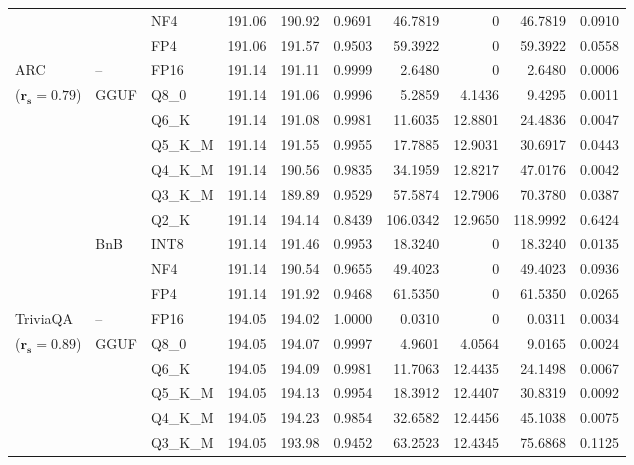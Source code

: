 \begin{longtable}{ll l rrrrrrr}
 &  & NF4 & 191.06 & 190.92 & 0.9691 & 46.7819 & \cellcolor{cyan!12} $0$ & 46.7819 & 0.0910 \\
 &  & FP4 & 191.06 & 191.57 & 0.9503 & 59.3922 & \cellcolor{cyan!12} $0$ & 59.3922 & 0.0558 \\
\midrule
ARC & -- & FP16 & 191.14 & 191.11 & 0.9999 & 2.6480 & \cellcolor{cyan!12} $0$ & 2.6480 & 0.0006 \\
{\small ($\mathbf{r_s{=}0.79}$)} & GGUF & Q8\_0 & 191.14 & 191.06 & 0.9996 & 5.2859 & 4.1436 & 9.4295 & 0.0011 \\
 &  & Q6\_K & 191.14 & 191.08 & 0.9981 & 11.6035 & 12.8801 & 24.4836 & 0.0047 \\
 &  & Q5\_K\_M & 191.14 & 191.55 & 0.9955 & 17.7885 & 12.9031 & 30.6917 & 0.0443 \\
 &  & Q4\_K\_M & 191.14 & 190.56 & 0.9835 & 34.1959 & 12.8217 & 47.0176 & 0.0042 \\
 &  & Q3\_K\_M & 191.14 & 189.89 & 0.9529 & 57.5874 & 12.7906 & 70.3780 & 0.0387 \\
 &  & Q2\_K & 191.14 & 194.14 & \cellcolor{red!18} 0.8439 & \cellcolor{red!18} 106.0342 & 12.9650 & \cellcolor{red!18} 118.9992 & \cellcolor{red!18} 0.6424 \\
 & BnB & INT8 & 191.14 & 191.46 & 0.9953 & 18.3240 & \cellcolor{cyan!12} $0$ & 18.3240 & 0.0135 \\
 &  & NF4 & 191.14 & 190.54 & 0.9655 & 49.4023 & \cellcolor{cyan!12} $0$ & 49.4023 & 0.0936 \\
 &  & FP4 & 191.14 & 191.92 & \cellcolor{red!18} 0.9468 & \cellcolor{red!18} 61.5350 & \cellcolor{cyan!12} $0$ & \cellcolor{red!18} 61.5350 & \cellcolor{red!18} 0.0265 \\
\midrule
TriviaQA & -- & FP16 & 194.05 & 194.02 & 1.0000 & 0.0310 & \cellcolor{cyan!12} $0$ & 0.0311 & 0.0034 \\
{\small ($\mathbf{r_s{=}0.89}$)} & GGUF & Q8\_0 & 194.05 & 194.07 & 0.9997 & 4.9601 & 4.0564 & 9.0165 & 0.0024 \\
 &  & Q6\_K & 194.05 & 194.09 & 0.9981 & 11.7063 & 12.4435 & 24.1498 & 0.0067 \\
 &  & Q5\_K\_M & 194.05 & 194.13 & 0.9954 & 18.3912 & 12.4407 & 30.8319 & 0.0092 \\
 &  & Q4\_K\_M & 194.05 & 194.23 & 0.9854 & 32.6582 & 12.4456 & 45.1038 & 0.0075 \\
 &  & Q3\_K\_M & 194.05 & 193.98 & \cellcolor{red!18} 0.9452 & \cellcolor{red!18} 63.2523 & 12.4345 & \cellcolor{red!18} 75.6868 & \cellcolor{red!18} 0.1125 \\

\end{longtable}

